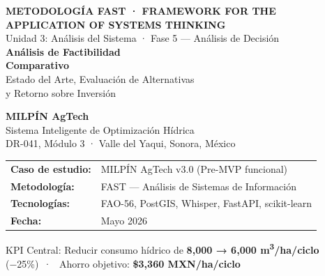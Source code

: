 \documentclass[12pt,letterpaper]{article}
\begin{document}

\begin{titlepage}
  \pagecolor{azulOscuro}
  \color{white}
  \vspace*{1.5cm}
  \begin{center}
    {\small\color{azulAccent}\bfseries
      METODOLOGÍA FAST · FRAMEWORK FOR THE APPLICATION OF SYSTEMS THINKING}\\[0.4cm]
    {\small\color{azulPalido}
      Unidad 3: Análisis del Sistema · Fase 5 — Análisis de Decisión}\\[1.8cm]

    {\huge\bfseries Análisis de Factibilidad\\[0.3cm]Comparativo}\\[0.6cm]
    {\large\color{azulAccent}
      Estado del Arte, Evaluación de Alternativas\\y Retorno sobre Inversión}\\[1.8cm]

    \begin{tcolorbox}[
      enhanced,colback=azulMedio,colframe=azulAccent,
      boxrule=1pt,arc=5pt,width=0.82\textwidth,
      left=12pt,right=12pt,top=10pt,bottom=10pt]
      \centering
      {\Large\bfseries\color{white} MILPÍN AgTech}\\[0.3cm]
      {\normalsize\color{azulPalido} Sistema Inteligente de Optimización Hídrica}\\[0.15cm]
      {\small\color{azulPalido} DR-041, Módulo 3 · Valle del Yaqui, Sonora, México}
    \end{tcolorbox}

    \vspace{1.8cm}
    {\small\color{azulPalido}
      \begin{tabular}{ll}
        \textbf{Caso de estudio:}    & MILPÍN AgTech v3.0 (Pre-MVP funcional)\\[4pt]
        \textbf{Metodología:}        & FAST — Análisis de Sistemas de Información\\[4pt]
        \textbf{Tecnologías:}        & FAO-56, PostGIS, Whisper, FastAPI, scikit-learn\\[4pt]
        \textbf{Fecha:}              & Mayo 2026\\
      \end{tabular}}

    \vspace{1.4cm}
    {\scriptsize\color{azulPalido}
      KPI Central: Reducir consumo hídrico de
      \textbf{8{,}000 → 6{,}000 m\textsuperscript{3}/ha/ciclo} (−25\%)~·~
      Ahorro objetivo: \textbf{\$3{,}360 MXN/ha/ciclo}}
  \end{center}
\end{titlepage}
\end{document}

